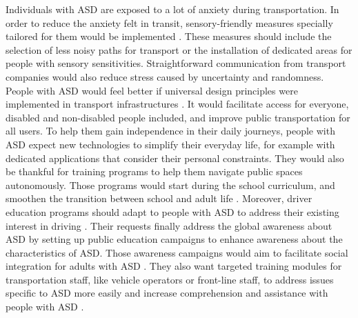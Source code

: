     Individuals with ASD are exposed to a lot of anxiety during transportation. In order to reduce the anxiety felt in transit, sensory-friendly measures specially tailored for them would be implemented \cite{haas_experiences_nodate}. These measures should include the selection of less noisy paths for transport or the installation of dedicated areas for people with sensory sensitivities. Straightforward communication from transport companies would also reduce stress caused by uncertainty and randomness.
    \newline
    \newline
    People with ASD would feel better if universal design principles were implemented in transport infrastructures \cite{haas_experiences_nodate}. It would facilitate access for everyone, disabled and non-disabled people included, and improve public transportation for all users.
    \newline
    \newline
    To help them gain independence in their daily journeys, people with ASD expect new technologies to simplify their everyday life, for example with dedicated applications that consider their personal constraints. They would also be thankful for training programs to help them navigate public spaces autonomously. Those programs would start during the school curriculum, and smoothen the transition between school and adult life \cite{deka_co-principal_nodate}. Moreover, driver education programs should adapt to people with ASD to address their existing interest in driving \cite{deka_co-principal_nodate}. 
    \newline
    \newline
    Their requests finally address the global awareness about ASD by setting up public education campaigns to enhance awareness about the characteristics of ASD. Those awareness campaigns would aim to facilitate social integration for adults with ASD \cite{deka_co-principal_nodate}. They also want targeted training modules for transportation staff, like vehicle operators or front-line staff, to address issues specific to ASD more easily and increase comprehension and assistance with people with ASD \cite{haas_experiences_nodate}. 
\newline
